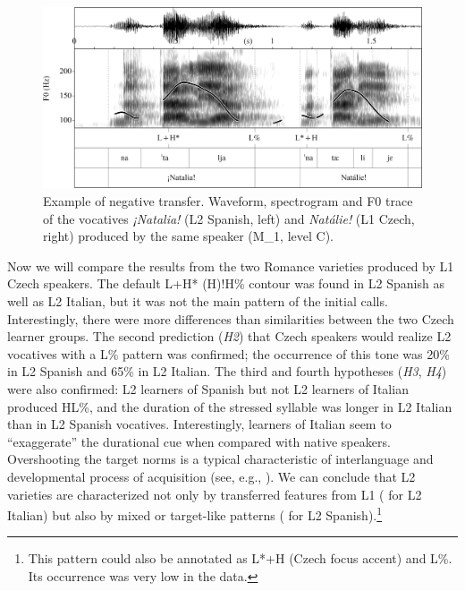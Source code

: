 \begin{figure}

\includegraphics[width=\textwidth]{figures/Figure_4.151.png}



\caption{Example of negative transfer. Waveform, spectrogram and F0 trace of the vocatives \textit{¡Natalia!} (L2 Spanish, left) and \textit{Natálie!} (L1 Czech, right) produced by the same speaker (M\_1, level C).}
\label{fig:4.151}
\end{figure}

Now we will compare the results from the two Romance varieties produced by L1 Czech speakers. The default L+H* (H)!H\% contour was found in L2 Spanish as well as L2 Italian, but it was not the main pattern of the initial calls. Interestingly, there were more differences than similarities between the two Czech learner groups. The second prediction (\textit{H2}) that Czech speakers would realize L2 vocatives with a L\% pattern was confirmed; the occurrence of this tone was  20\% in L2 Spanish and 65\% in L2 Italian. The third and fourth hypotheses (\textit{H3}, \textit{H4}) were also confirmed: L2 learners of Spanish but not L2 learners of Italian produced HL\%, and the duration of the stressed syllable was longer in L2 Italian than in L2 Spanish vocatives. Interestingly, learners of Italian seem to “exaggerate” the durational cue when compared with native speakers. Overshooting the target norms is a typical characteristic of interlanguage and developmental process of acquisition (see, e.g., \citealt{Flege1980}). We can conclude that L2 varieties are characterized not only by transferred features from L1 ( for L2 Italian) but also by mixed or target-like patterns ( for L2 Spanish).\footnote{This pattern could also be annotated as L*+H (Czech focus accent) and L\%. Its occurrence was very low in the data.}

